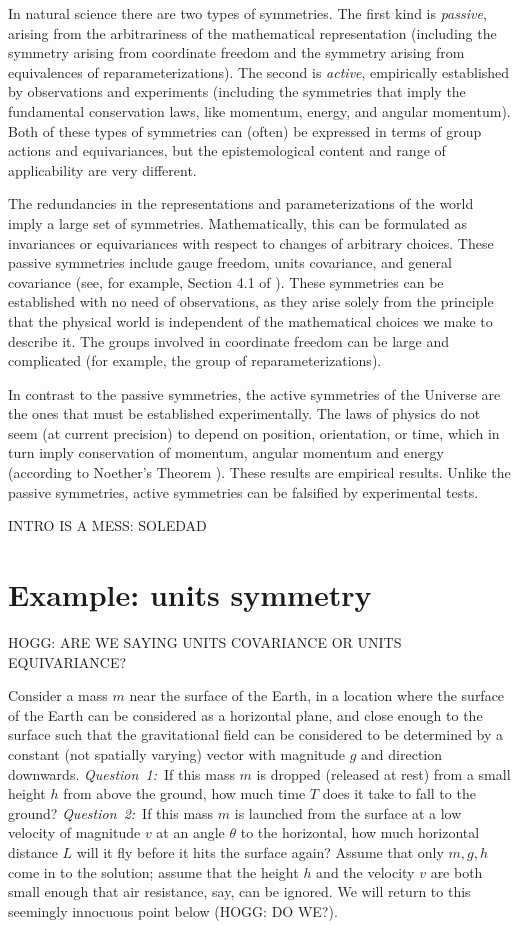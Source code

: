 \documentclass{article}
\theoremstyle{plain}
\theoremstyle{definition}
\theoremstyle{remark}
\begin{document}
In natural science there are two types of symmetries. 
The first kind is \emph{passive}, arising from the arbitrariness of the mathematical representation (including the symmetry arising from coordinate freedom and the symmetry arising from equivalences of reparameterizations).
The second is \emph{active}, empirically established by observations and experiments (including the symmetries that imply the fundamental conservation laws, like momentum, energy, and angular momentum).
Both of these types of symmetries can (often) be expressed in terms of group actions and equivariances, but the epistemological content and range of applicability are very different. 

The redundancies in the representations and parameterizations of the world imply a large set of symmetries.
Mathematically, this can be formulated as invariances or equivariances with respect to changes of arbitrary choices.
These passive symmetries include gauge freedom, units covariance, and general covariance (see, for example, Section 4.1 of \cite{rovelli2000loop}).
These symmetries can be established with no need of observations, as they arise solely from the principle that the physical world is independent of the mathematical choices we make to describe it.
The groups involved in coordinate freedom can be large and complicated (for example, the group of reparameterizations).

In contrast to the passive symmetries, the active symmetries of the Universe are the ones that must be established experimentally.
The laws of physics do not seem (at current precision) to depend on position, orientation, or time, which in turn imply conservation of momentum, angular momentum and energy (according to Noether's Theorem \citealt{noether}).
These results are empirical results.
Unlike the passive symmetries, active symmetries can be falsified by experimental tests.

INTRO IS A MESS: SOLEDAD 

\section{Example: units symmetry}\label{sec:units}

HOGG: ARE WE SAYING UNITS COVARIANCE OR UNITS EQUIVARIANCE?

Consider a mass $m$ near the surface of the Earth, in a location where the surface of the Earth can be considered as a horizontal plane, and close enough to the surface such that the gravitational field can be considered to be determined by a constant (not spatially varying) vector with magnitude $g$ and direction downwards.
\textsl{Question~1:}~If this mass $m$ is dropped (released at rest) from a small height $h$ from above the ground, how much time $T$ does it take to fall to the ground?
\textsl{Question~2:}~If this mass $m$ is launched from the surface at a low velocity of magnitude $v$ at an angle $\theta$ to the horizontal, how much horizontal distance $L$ will it fly before it hits the surface again?
Assume that only $m, g, h$ come in to the solution; assume that the height $h$ and the velocity $v$ are both small enough that air resistance, say, can be ignored.
We will return to this seemingly innocuous point below (HOGG: DO WE?).
\end{document}
